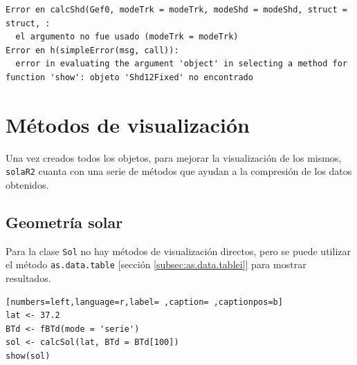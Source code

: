 \begin{verbatim}
Error en calcShd(Gef0, modeTrk = modeTrk, modeShd = modeShd, struct = struct, : 
  el argumento no fue usado (modeTrk = modeTrk)
Error en h(simpleError(msg, call)): 
  error in evaluating the argument 'object' in selecting a method for function 'show': objeto 'Shd12Fixed' no encontrado
\end{verbatim}

\section{Métodos de visualización}
\label{sec:org90abead}
\label{sec:metodos-visualizacion}
Una vez creados todos los objetos, para mejorar la visualización de los mismos, \texttt{solaR2} cuanta con una serie de métodos que ayudan a la compresión de los datos obtenidos.

\subsection{Geometría solar}
\label{sec:org15a59bd}
Para la clase \texttt{Sol} no hay métodos de visualización directos, pero se puede utilizar el método \texttt{as.data.table} [sección \ref{subsec:as.data.tablei}] para mostrar resultados.
\begin{lstlisting}[numbers=left,language=r,label= ,caption= ,captionpos=b]
lat <- 37.2
BTd <- fBTd(mode = 'serie')
sol <- calcSol(lat, BTd = BTd[100])
show(sol)
\end{lstlisting}

